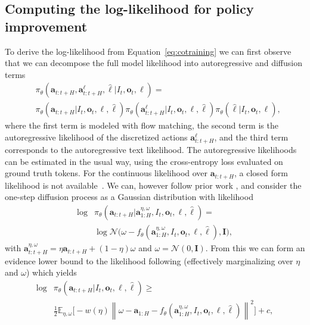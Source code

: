 \documentclass[conference]{IEEEtran}
\newcommand{\ba}{\mathbf{a}}
\newcommand{\bo}{\mathbf{o}}
\newcommand{\bI}{\mathbf{I}}
\newcommand{\lang}{\ell}
\newcommand{\rawtext}{\hat{\ell}} %
\begin{document}
\subsection{Computing the log-likelihood for policy improvement}
\label{sect:lower_bound_loss}
To derive the log-likelihood from Equation~\eqref{eq:cotraining} we can first observe that we can decompose the full model likelihood into autoregressive and diffusion terms
\begin{equation}
\begin{aligned}
&\pi_\theta(\ba_{t:t+H}, \ba^{\lang}_{t:t+H}, \rawtext \vert I_t, \bo_t, \lang) = \\ &\pi_\theta(\ba_{t:t+H} \vert I_t, \bo_t, \lang, \rawtext) \pi_\theta(\ba^{\lang}_{t:t+H} \vert I_t, \bo_t, \lang, \rawtext) \pi_\theta(\rawtext \vert I_t, \bo_t, \lang),
\end{aligned}
\end{equation}
where the first term is modeled with flow matching, the second term is the autoregressive likelihood of the discretized actions $\ba^{\lang}_{t:t+H}$, and the third term corresponds to the autoregressive text likelihood. The autoregressive likelihoods can be estimated in the usual way, using the cross-entropy loss evaluated on ground truth tokens. For the continuous likelihood over $\ba_{t:t+H}$, a closed form likelihood is not available~\citep{lipman2022flow}. We can, however follow prior work \citep{mcallister2025fpo}, and consider the one-step diffusion process as a Gaussian distribution with likelihood
\begin{equation}
\begin{aligned}
    \log &\pi_\theta(\ba_{t:t+H} \vert \ba^{\eta, \omega}_{1:H}, I_t, \bo_t, \lang, \hat{\ell}) = \\
    &\log \mathcal{N}\Big(\omega - f_\theta(\ba^{\eta, \omega}_{1:H}, I_t, \bo_t, \lang, \hat{\ell}),  \mathbf{I} \Big), 
\end{aligned}
\end{equation}
with  
$\ba_{t:t+H}^{\eta, \omega} = \eta \ba_{t:t+H} + (1-\eta)\omega$ and $\omega = \mathcal{N}(0, \bI)$. From this we can form an evidence lower bound to the likelihood following \citep{KingaDiffELBO, mcallister2025fpo} (effectively marginalizing over $\eta$ and $\omega$) which yields
\begin{equation}
\begin{aligned}
\log &\pi_\theta(\ba_{t:t+H} \vert I_t, \bo_t, \lang, \hat{\ell}) \geq \\
&\frac{1}{2} \mathbb{E}_{\eta, \omega} \Big[ - w(\eta)  \left\|\omega - \ba_{1:H} - f_\theta(\ba^{\eta, \omega}_{1:H}, I_t, \bo_t, \lang, \hat{\ell})\right\|^2  \Big] + c,
\end{aligned}
\end{equation}
\end{document}
